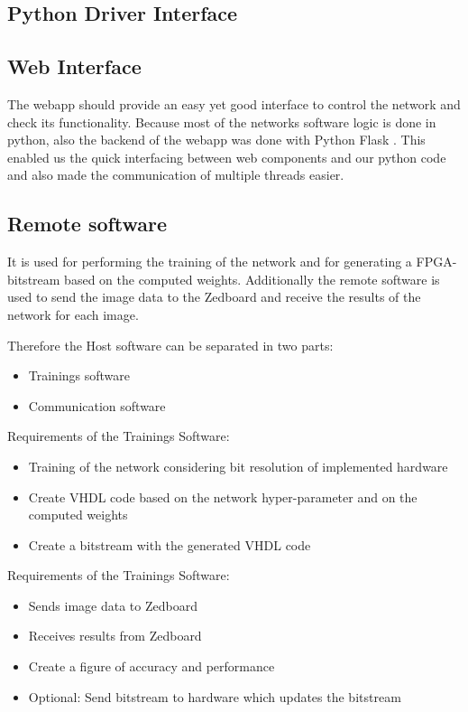 \subsection{Python Driver Interface}

\subsection{Web Interface}

The webapp should provide an easy yet good interface to control the network and check its functionality. Because most of the networks software logic is done in python, also the backend of the webapp was done with Python Flask \cite{Pallets:2020aa}. This enabled us the quick interfacing between web components and our python code and also made the communication of multiple threads easier.



\subsection{Remote software}

It is used for performing the training of the network and for generating a FPGA-bitstream based on the computed weights. Additionally the remote software is used to send the image data to the Zedboard and receive the results of the network for each image. 

Therefore the Host software can be separated in two parts:
\begin{itemize}
	\item Trainings software
	\item Communication software
\end{itemize} 

Requirements of the Trainings Software:
\begin{itemize} 
	\item Training of the network considering bit resolution of implemented hardware
	\item Create VHDL code based on the network hyper-parameter and on the computed weights
	\item Create a bitstream with the generated VHDL code
\end{itemize}

Requirements of the Trainings Software:
\begin{itemize}
	\item Sends image data to Zedboard
	\item Receives results from Zedboard
	\item Create a figure of accuracy and performance   
	\item Optional: Send bitstream to hardware which updates the bitstream 
\end{itemize}

